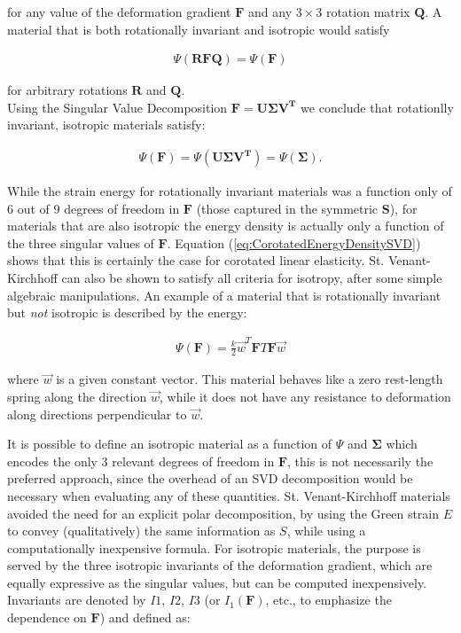 for any value of the deformation gradient $\boldsymbol{F}$ and any $3 \times 3$ rotation matrix $\boldsymbol{Q}$. A material that is both 
rotationally invariant and isotropic would satisfy

\begin{gather*}
 \Psi(\boldsymbol{RFQ})=\Psi(\boldsymbol{F})
\end{gather*}

for arbitrary rotations $\boldsymbol{R}$ and $\boldsymbol{Q}$.\\

Using the Singular Value Decomposition $\boldsymbol{F} = \boldsymbol{U\Sigma V^T}$ we conclude that rotationlly invariant, isotropic materials satisfy:

\begin{gather*}
 \Psi(\boldsymbol{F})=\Psi(\boldsymbol{U\Sigma V^T}) = \Psi(\boldsymbol{\Sigma}).
\end{gather*}

While the strain energy for rotationally invariant materials was a function only of 6 out of 9 degrees of freedom in $\boldsymbol{F}$ (those 
captured in the symmetric $\boldsymbol{S}$), for materials that are also isotropic the energy density is actually only a function of the three 
singular values of $\boldsymbol{F}$. Equation (\ref{eq:CorotatedEnergyDensitySVD}) shows that this is certainly the case for corotated linear 
elasticity. St. Venant-Kirchhoff can also be shown to satisfy all criteria for isotropy, after some simple algebraic manipulations. An example 
of a material that is rotationally invariant but \textit{not} isotropic is described by the energy:

\begin{gather*}
 \Psi(\boldsymbol{F}) = \frac{k}{2}\vec{w}^T\boldsymbol{F}T\boldsymbol{F}\vec{w}
\end{gather*}

where $\vec{w}$ is a given constant vector. This material behaves like a zero rest-length spring along the direction $\vec{w}$, while it does
not have any resistance to deformation along directions perpendicular to $\vec{w}$.

It is possible to define an isotropic material as a function of $\Psi$ and $\boldsymbol{\Sigma}$ which encodes the only 3 relevant degrees of freedom
in $\boldsymbol{F}$, this is not necessarily the preferred approach, since the overhead of an SVD decomposition would be necessary when evaluating 
any of these quantities. St. Venant-Kirchhoff materials avoided the need for an explicit polar decomposition, by using the Green strain $E$
to convey (qualitatively) the same information as $S$, while using a computationally inexpensive formula. For isotropic materials, the purpose is served 
by the three isotropic invariants of the deformation gradient, which are equally expressive as the singular values, but can be computed inexpensively. 
Invariants are denoted by $I1$, $I2$, $I3$ (or $I_1(\boldsymbol{F})$, etc., to emphasize the dependence on $\boldsymbol{F}$) and defined as:

